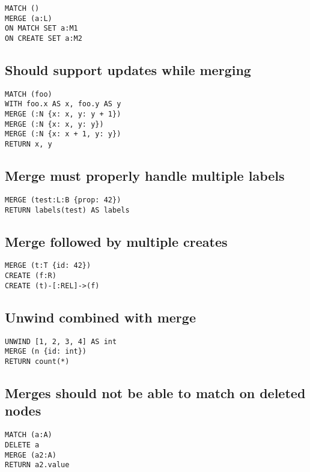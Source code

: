 \begin{lstlisting}
MATCH ()
MERGE (a:L)
ON MATCH SET a:M1
ON CREATE SET a:M2
\end{lstlisting}

\subsection{Should support updates while merging}

\begin{lstlisting}
MATCH (foo)
WITH foo.x AS x, foo.y AS y
MERGE (:N {x: x, y: y + 1})
MERGE (:N {x: x, y: y})
MERGE (:N {x: x + 1, y: y})
RETURN x, y
\end{lstlisting}

\subsection{Merge must properly handle multiple labels}

\begin{lstlisting}
MERGE (test:L:B {prop: 42})
RETURN labels(test) AS labels
\end{lstlisting}

\subsection{Merge followed by multiple creates}

\begin{lstlisting}
MERGE (t:T {id: 42})
CREATE (f:R)
CREATE (t)-[:REL]->(f)
\end{lstlisting}

\subsection{Unwind combined with merge}

\begin{lstlisting}
UNWIND [1, 2, 3, 4] AS int
MERGE (n {id: int})
RETURN count(*)
\end{lstlisting}

\subsection{Merges should not be able to match on deleted nodes}

\begin{lstlisting}
MATCH (a:A)
DELETE a
MERGE (a2:A)
RETURN a2.value
\end{lstlisting}

